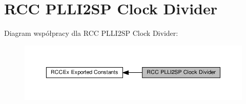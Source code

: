 \hypertarget{group___r_c_c_ex___p_l_l_i2_s_p___clock___divider}{}\section{R\+CC P\+L\+L\+I2\+SP Clock Divider}
\label{group___r_c_c_ex___p_l_l_i2_s_p___clock___divider}
Diagram współpracy dla R\+CC P\+L\+L\+I2\+SP Clock Divider\+:\nopagebreak
\begin{figure}[H]
\begin{center}
\leavevmode
\includegraphics[width=350pt]{group___r_c_c_ex___p_l_l_i2_s_p___clock___divider}
\end{center}
\end{figure}
